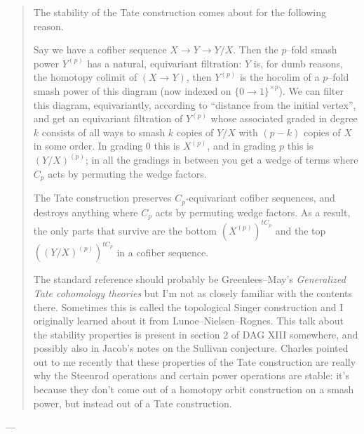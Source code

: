 \begin{quote}
The stability of the Tate construction comes about for the following reason.

Say we have a cofiber sequence $X \to Y \to Y/X$. Then the $p$--fold smash power $Y^{(p)}$ has a natural, equivariant filtration: $Y$ is, for dumb reasons, the homotopy colimit of $(X \to Y)$, then $Y^{(p)}$ is the hocolim of a $p$--fold smash power of this diagram (now indexed on $\{0 \to 1\}^{\times p}$). We can filter this diagram, equivariantly, according to ``distance from the initial vertex'', and get an equivariant filtration of $Y^{(p)}$ whose associated graded in degree $k$ consists of all ways to smash $k$ copies of $Y/X$ with $(p-k)$ copies of $X$ in some order. In grading $0$ this is $X^{(p)}$, and in grading $p$ this is $(Y/X)^{(p)}$; in all the gradings in between you get a wedge of terms where $C_p$ acts by permuting the wedge factors.

The Tate construction preserves $C_p$-equivariant cofiber sequences, and destroys anything where $C_p$ acts by permuting wedge factors. As a result, the only parts that survive are the bottom $(X^{(p)})^{tC_p}$ and the top $((Y/X)^{(p)})^{tC_p}$ in a cofiber sequence.

The standard reference should probably be Greenlees--May's \textit{Generalized Tate cohomology theories} but I'm not as closely familiar with the contents there. Sometimes this is called the topological Singer construction and I originally learned about it from Lunoe--Nielsen--Rognes. This talk about the stability properties is present in section 2 of DAG XIII somewhere, and possibly also in Jacob's notes on the Sullivan conjecture. Charles pointed out to me recently that these properties of the Tate construction are really why the Steenrod operations and certain power operations are stable: it's because they don't come out of a homotopy orbit construction on a smash power, but instead out of a Tate construction.
\end{quote}



---






